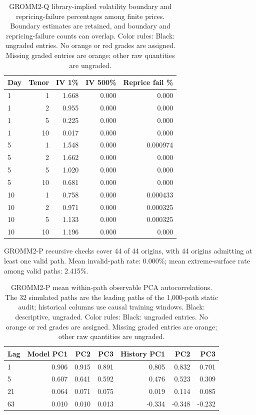 \documentclass[11pt]{article}
\begin{document}
\begin{table}[H]\centering\small\setlength{\tabcolsep}{4pt}
\caption{GROMM2-Q library-implied volatility boundary and repricing-failure percentages among finite prices. Boundary estimates are retained, and boundary and repricing-failure counts can overlap. Color rules: Black: ungraded entries. No orange or red grades are assigned. Missing graded entries are orange; other raw quantities are ungraded.}\label{tab:gromm2-q-static-iv}
\begin{tabular}{@{}lrrrr@{}}
\toprule
Day & Tenor & IV 1\% & IV 500\% & Reprice fail \% \\
\midrule
1 & 1 & 1.668 & 0.000 & 0.000 \\
1 & 2 & 0.955 & 0.000 & 0.000 \\
1 & 5 & 0.225 & 0.000 & 0.000 \\
1 & 10 & 0.017 & 0.000 & 0.000 \\
5 & 1 & 1.548 & 0.000 & 0.000974 \\
5 & 2 & 1.662 & 0.000 & 0.000 \\
5 & 5 & 1.020 & 0.000 & 0.000 \\
5 & 10 & 0.681 & 0.000 & 0.000 \\
10 & 1 & 0.758 & 0.000 & 0.000433 \\
10 & 2 & 0.971 & 0.000 & 0.000325 \\
10 & 5 & 1.133 & 0.000 & 0.000325 \\
10 & 10 & 1.196 & 0.000 & 0.000 \\
\bottomrule\end{tabular}\end{table}

GROMM2-P recursive checks cover 44 of 44 origins, with 44 origins admitting at least one valid path. Mean invalid-path rate: 0.000\%; mean extreme-surface rate among valid paths: 2.415\%.

\begin{table}[H]\centering\small\setlength{\tabcolsep}{4pt}
\caption{GROMM2-P mean within-path observable PCA autocorrelations. The 32 simulated paths are the leading paths of the 1,000-path static audit; historical columns use causal training windows. Black: descriptive, ungraded. Color rules: Black: ungraded entries. No orange or red grades are assigned. Missing graded entries are orange; other raw quantities are ungraded.}\label{tab:gromm2-p-acf}
\begin{tabular}{@{}lrrrrrr@{}}
\toprule
Lag & Model PC1 & PC2 & PC3 & History PC1 & PC2 & PC3 \\
\midrule
1 & 0.906 & 0.915 & 0.891 & 0.805 & 0.832 & 0.701 \\
5 & 0.607 & 0.641 & 0.592 & 0.476 & 0.523 & 0.309 \\
21 & 0.064 & 0.071 & 0.075 & 0.019 & 0.114 & 0.085 \\
63 & 0.010 & 0.010 & 0.013 & -0.334 & -0.348 & -0.232 \\
\bottomrule\end{tabular}\end{table}
\end{document}
